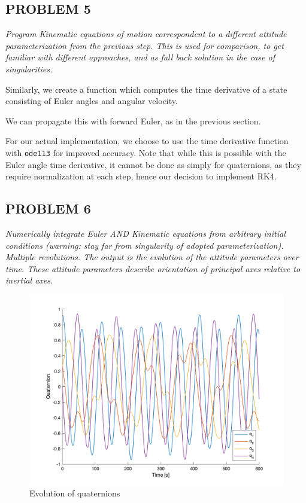 \subsection{PROBLEM 5}
\textit{Program Kinematic equations of motion correspondent to a different attitude parameterization from the previous step. This is used for comparison, to get familiar with different approaches, and as fall back solution in the case of singularities.}

Similarly, we create a function which computes the time derivative of a state consisting of Euler angles and angular velocity.



We can propagate this with forward Euler, as in the previous section.



For our actual implementation, we choose to use the time derivative function with \texttt{ode113} for improved accuracy. Note that while this is possible with the Euler angle time derivative, it cannot be done as simply for quaternions, as they require normalization at each step, hence our decision to implement RK4.


\subsection{PROBLEM 6}
\textit{Numerically integrate Euler AND Kinematic equations from arbitrary initial conditions (warning: stay far from singularity of adopted parameterization). Multiple revolutions. The output is the evolution of the attitude parameters over time. These attitude parameters describe orientation of principal axes relative to inertial axes.}

\begin{figure}[H]
\centering
\includegraphics[scale=0.6]{Images/ps3_problem6_quaternions.png}
\caption{Evolution of quaternions}
\label{fig:ps3_problem6_quaternions}
\end{figure}

